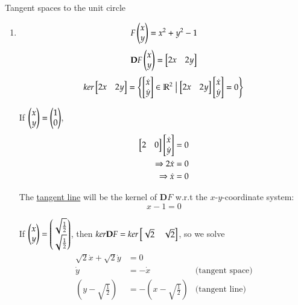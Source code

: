 \example Tangent spaces to the unit circle
\begin{enumerate}[1.]
\item
\begin{minipage}{0.7\textwidth}
\[F\begin{pmatrix} x \\ y \end{pmatrix}=x^2+y^2-1\]
\[\textbf{D}F\begin{pmatrix} x \\ y \end{pmatrix}=\begin{bmatrix} 2x & 2y \end{bmatrix}\]
\[ker\begin{bmatrix} 2x & 2y \end{bmatrix} = \left\{ \begin{bmatrix} \dot{x} \\ \dot{y} \end{bmatrix}\in \mathbb{R}^2 \bigm| \begin{bmatrix} 2x & 2y \end{bmatrix}\begin{bmatrix} \dot{x} \\ \dot{y} \end{bmatrix}=0 \right\}\]
\end{minipage}
\begin{minipage}{0.3\textwidth}
If $\begin{pmatrix} x \\ y \end{pmatrix} = \begin{pmatrix} 1 \\ 0 \end{pmatrix}$,
\begin{align*}
  \begin{bmatrix} 2 & 0 \end{bmatrix}\begin{bmatrix} \dot{x} \\ \dot{y} \end{bmatrix} &= 0 \\
  \Rightarrow 2\dot{x} &= 0 \\
  \Rightarrow \dot{x} &= 0
\end{align*}
\end{minipage}

\begin{center}
\end{center}

The \ul{tangent line} will be the kernel of $\bm{D}F$ w.r.t the $x$-$y$-coordinate system:
\[\boxed{x-1=0}\]

If $\begin{pmatrix} x \\ y \end{pmatrix} = \begin{pmatrix} \sqrt{\frac{1}{2}} \\ \sqrt{\frac{1}{2}} \end{pmatrix}$, then $ker \textbf{D}F = ker\begin{bmatrix} \sqrt{2} & \sqrt{2} \end{bmatrix}$, so we solve
\begin{align*}
\sqrt{2}\dot{x}+\sqrt{2}\dot{y}&=0 \\
\dot{y}&=-\dot{x} & \text{(tangent space)} \\
(y-\sqrt{\frac{1}{2}}) &=-(x-\sqrt{\frac{1}{2}}) & \text{(tangent line)}
\end{align*}


\end{enumerate}
